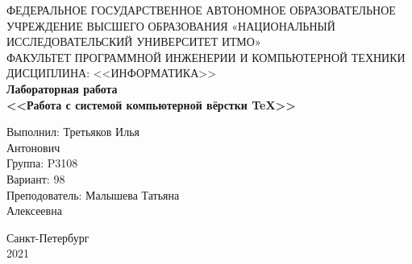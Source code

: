 \begin{center}
    {\small
    ФЕДЕРАЛЬНОЕ ГОСУДАРСТВЕННОЕ АВТОНОМНОЕ ОБРАЗОВАТЕЛЬНОЕ УЧРЕЖДЕНИЕ ВЫСШЕГО ОБРАЗОВАНИЯ «НАЦИОНАЛЬНЫЙ ИССЛЕДОВАТЕЛЬСКИЙ УНИВЕРСИТЕТ ИТМО»
    }\\
    \hspace{\textwidth}
    {\small
    ФАКУЛЬТЕТ ПРОГРАММНОЙ ИНЖЕНЕРИИ И КОМПЬЮТЕРНОЙ ТЕХНИКИ
    }\\
    \hspace{\textwidth}
    {\small
    ДИСЦИПЛИНА: <<ИНФОРМАТИКА>>
    }\\
    \vspace{20em}
    {\huge \bfseries
    Лабораторная работа \\
    <<Работа с системой компьютерной вёрстки \TeX>>
    }
    \vspace{20em}
    \begin{adjustwidth}{32em}{}
    \begin{FlushLeft}
     Выполнил: Третьяков Илья\\
     Антонович\\
     Группа: P3108\\
     Вариант: 98\\
     Преподователь: Малышева Татьяна\\
     Алексеевна
    \end{FlushLeft}
    \end{adjustwidth}
    \vspace{10em}
    Санкт-Петербург\\
    2021
\end{center}
